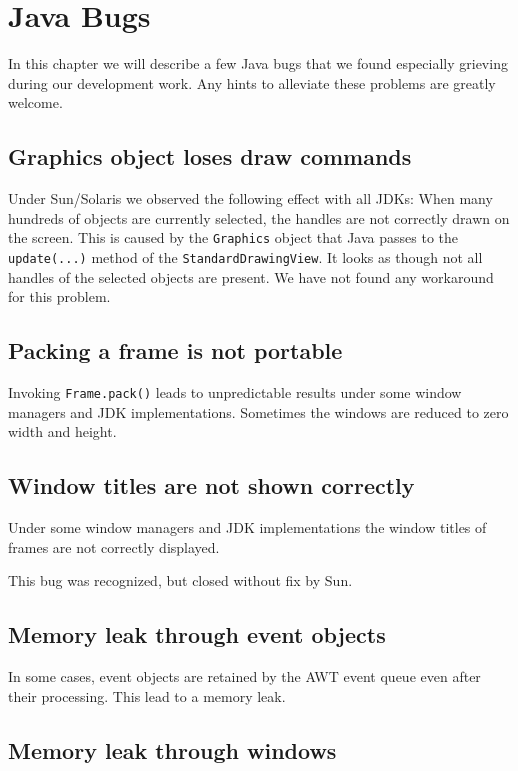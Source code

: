 \chapter{Java Bugs}

In this chapter we will describe a few Java bugs that
we found especially grieving during our development work.
Any hints to alleviate these problems are greatly welcome.


\section{Graphics object loses draw commands}

Under Sun/Solaris we observed the following effect with all
JDKs: When many hundreds of objects are currently selected,
the handles are not correctly drawn on the screen. This is caused 
by the \texttt{Graphics} object that Java passes to the \texttt{update(...)}
method of the \texttt{StandardDrawingView}. It looks as though not all
handles of the selected objects are present.
We have not found any workaround for this problem.


\section{Packing a frame is not portable}

Invoking \texttt{Frame.pack()} leads to unpredictable
results under some window managers and JDK implementations. 
Sometimes the windows are reduced to zero width and height.


\section{Window titles are not shown correctly}

Under some window managers and JDK implementations
the window titles of frames are not correctly displayed.

This bug was recognized, but closed without fix by Sun.


\section{Memory leak through event objects}

In some cases, event objects are retained by the AWT event queue
even after their processing. This lead to a memory leak.


\section{Memory leak through windows}


